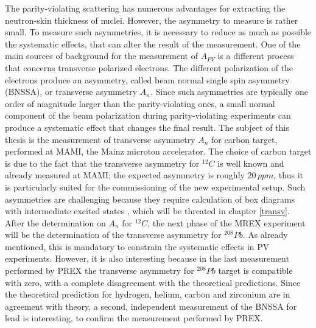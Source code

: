 The parity-violating scattering has numerous advantages for extracting the neutron-skin thickness of nuclei. However, the asymmetry to measure is rather small. To measure such asymmetries, it is necessary to reduce as much as possible the systematic effects, that can alter the result of the measurement. One of the main sources of background for the measurement of $A_{PV}$ is a different process that concerns transverse polarized electrons. The different polarization of the electrons produce an asymmetry, called beam normal single spin asymmetry (BNSSA), or transverse asymmetry $A_{n}$. Since such asymmetries are typically one order of magnitude larger than the parity-violating ones, a small normal component of the beam polarization during parity-violating experiments can produce a systematic effect that changes the final result. The subject of this thesis is the measurement of transverse asymmetry $A_{n}$ for carbon target, performed at MAMI, the Mainz microton accelerator. The choice of carbon target is due to the fact that the transverse asymmetry for $^{12}C$ is well known and already measured at MAMI; the expected asymmetry is roughly $20 \, ppm$, thus it is particularly suited for the commissioning of the new experimental setup. Such asymmetries are challenging because they require calculation of box diagrams with intermediate excited states \cite{Gorchtein_2008}, which will be threated in chapter \ref{transv}. After the determination on $A_{n}$ for $^{12}C$, the next phase of the MREX experiment will be the determination of the transverse asymmetry for $^{208}Pb$. As already mentioned, this is mandatory to constrain the systematic effects in PV experiments. However, it is also interesting because in the last measurement performed by PREX \cite{HAPPEX:2012fud} the transverse asymmetry for $^{208}Pb$ target is compatible with zero, with a complete disagreement with the theoretical predictions. Since the theoretical prediction for hydrogen, helium, carbon and zirconium are in agreement with theory, a second, independent measurement of the BNSSA for lead is interesting, to confirm the measurement performed by PREX.  
